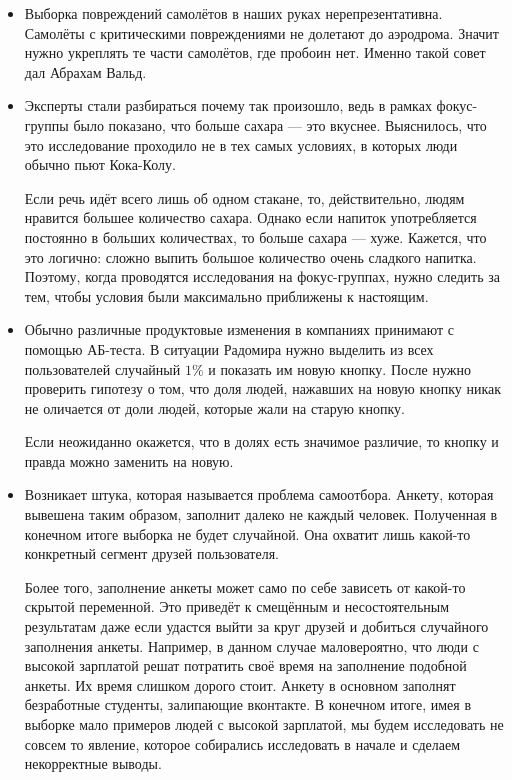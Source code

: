 \documentclass[12pt, a4paper, oneside]{article}
\theoremstyle{plain} %
\theoremstyle{definition}
\begin{document}
\begin{solution}
\begin{itemize} 
\item Выборка повреждений самолётов в наших руках нерепрезентативна. Самолёты с критическими повреждениями не долетают до аэродрома. Значит нужно укреплять те части самолётов, где пробоин нет. Именно такой совет дал Абрахам Вальд. 

\item Эксперты стали разбираться почему так произошло, ведь в рамках фокус-группы было показано, что больше сахара --- это вкуснее. Выяснилось, что это исследование проходило не в тех самых условиях, в которых люди обычно пьют Кока-Колу. 

Если речь идёт всего лишь об одном стакане, то, действительно, людям нравится большее количество сахара. Однако если напиток употребляется постоянно в больших количествах, то больше сахара --- хуже. Кажется, что это логично: сложно выпить большое количество очень сладкого напитка. Поэтому, когда проводятся исследования на фокус-группах, нужно следить за тем, чтобы условия были максимально приближены к настоящим.

\item Обычно различные продуктовые изменения в компаниях принимают с помощью АБ-теста. В ситуации Радомира нужно выделить из всех пользователей случайный $1\%$ и показать им новую кнопку.  После нужно проверить гипотезу о том, что доля людей, нажавших на новую кнопку никак не оличается от доли людей, которые жали на старую кнопку. 

Если неожиданно окажется, что в долях есть значимое различие, то кнопку и правда можно заменить на новую. 

\item Возникает штука, которая называется проблема самоотбора. Анкету, которая вывешена таким образом, заполнит далеко не каждый человек. Полученная в конечном итоге выборка не будет случайной. Она охватит лишь какой-то конкретный сегмент друзей пользователя.

Более того, заполнение анкеты может само по себе зависеть от какой-то скрытой переменной. Это приведёт к смещённым и несостоятельным результатам даже если удастся выйти за круг друзей и добиться случайного заполнения анкеты. Например, в данном случае маловероятно, что люди с высокой зарплатой решат потратить своё время на заполнение подобной анкеты. Их время слишком дорого стоит. Анкету в основном заполнят безработные студенты, залипающие вконтакте. В конечном итоге, имея в выборке мало примеров людей с высокой зарплатой, мы будем исследовать не совсем то явление, которое собирались исследовать в начале и сделаем некорректные выводы.


\end{itemize}
\end{solution}
\end{document}
